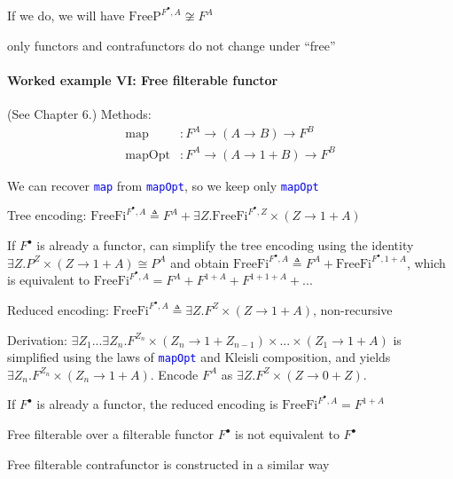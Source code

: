 If we do, we will have $\text{FreeP}^{F^{\bullet},A}\not\cong F^{A}$ 

only functors and contrafunctors do not change under \textsf{``}free\textsf{''}


\paragraph{Worked example VI: Free filterable functor}

(See Chapter 6.) Methods:
\begin{align*}
\text{map} & :F^{A}\rightarrow\left(A\rightarrow B\right)\rightarrow F^{B}\\
\text{mapOpt} & :F^{A}\rightarrow\left(A\rightarrow1+B\right)\rightarrow F^{B}
\end{align*}

We can recover \texttt{\textcolor{blue}{\footnotesize{}map}} from
\texttt{\textcolor{blue}{\footnotesize{}mapOpt}}, so we keep only
\texttt{\textcolor{blue}{\footnotesize{}mapOpt}} 

Tree encoding: $\text{FreeFi}^{F^{\bullet},A}\triangleq F^{A}+\exists Z.\text{FreeFi}^{F^{\bullet},Z}\times\left(Z\rightarrow1+A\right)$

If $F^{\bullet}$ is already a functor, can simplify the tree encoding
using the identity $\exists Z.P^{Z}\times\left(Z\rightarrow1+A\right)\cong P^{A}$
and obtain $\text{FreeFi}^{F^{\bullet},A}\triangleq F^{A}+\text{FreeFi}^{F^{\bullet},1+A}$,
which is equivalent to $\text{FreeFi}^{F^{\bullet},A}=F^{A}+F^{1+A}+F^{1+1+A}+...$

Reduced encoding: $\text{FreeFi}^{F^{\bullet},A}\triangleq\exists Z.F^{Z}\times\left(Z\rightarrow1+A\right)$,
non-recursive

Derivation: $\exists Z_{1}...\exists Z_{n}.F^{Z_{n}}\times\left(Z_{n}\rightarrow1+Z_{n-1}\right)\times...\times\left(Z_{1}\rightarrow1+A\right)$
is simplified using the laws of \texttt{\textcolor{blue}{\footnotesize{}mapOpt}}
and Kleisli composition, and yields $\exists Z_{n}.F^{Z_{n}}\times\left(Z_{n}\rightarrow1+A\right)$.
Encode $F^{A}$ as $\exists Z.F^{Z}\times\left(Z\rightarrow0+Z\right)$.

If $F^{\bullet}$ is already a functor, the reduced encoding is $\text{FreeFi}^{F^{\bullet},A}=F^{1+A}$

Free filterable over a filterable functor $F^{\bullet}$ is not equivalent
to $F^{\bullet}$

Free filterable contrafunctor is constructed in a similar way


